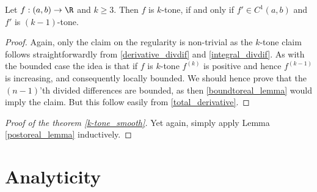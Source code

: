 \begin{lem}\label{postoreal_lemma}
	Let $f : (a, b) \to \R$ and $k \geq 3$. Then $f$ is $k$-tone, if and only if $f' \in C^{1}(a, b)$ and $f'$ is $(k - 1)$-tone.
\end{lem}
\begin{proof}
	Again, only the claim on the regularity is non-trivial as the $k$-tone claim follows straightforwardly from  \ref{derivative_divdif} and \ref{integral_divdif}. As with the bounded case the idea is that if $f$ is $k$-tone $f^{(k)}$ is positive and hence $f^{(k - 1)}$ is increasing, and consequently locally bounded. We should hence prove that the $(n - 1)$'th divided differences are bounded, as then \ref{boundtoreal_lemma} would imply the claim. But this follow easily from \ref{total_derivative}.
\end{proof}

\begin{proof}[Proof of the theorem \ref{k-tone_smooth}]
	Yet again, simply apply Lemma \ref{postoreal_lemma} inductively.
\end{proof}

\section{Analyticity}

